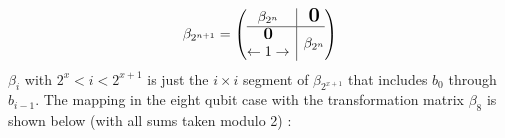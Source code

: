 \documentclass[twoside]{article}
\begin{document}
\begin{equation}
        \beta_{2^{n+1}} = \left( \begin{array}{@{}c|c@{}} 
                        \beta_{2^n}  & \begin{matrix}
                                \mbox{\normalfont \Large \bfseries 0}\\
                        \end{matrix} \\
                \hline
                \begin{matrix} \mbox{\normalfont\large\bfseries 0}\\
                        \leftarrow 1 \rightarrow 
                \end{matrix} &  \beta_{2^n}
        \end{array}
         \right)
\end{equation}
$\beta_i$ with $2^x < i < 2^{x+1}$ is just the $i \times i$ segment of $\beta_{2^{x+1}}$ that includes $b_0$ through $b_{i-1}$. The mapping in the eight qubit case with the transformation matrix $\beta_8$ is shown below (with all sums taken modulo 2) \cite{tranter2018}:
\end{document}
